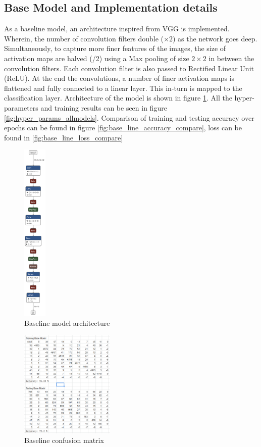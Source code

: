 \documentclass[conference]{IEEEtran}
\begin{document}
		\subsection{Base Model and Implementation details}
		As a baseline model, an architecture inspired from VGG is implemented. Wherein, the number of convolution filters double ($ \times 2$) as the network goes deep. Simultaneously, to capture more finer features of the images, the size of activation maps are halved (/2) using a Max pooling of size $2 \times 2$ in between the convolution filters. Each convolution filter is also passed to Rectified Linear Unit (ReLU). At the end the convolutions, a number of finer activation maps is flattened and fully connected to a linear layer. This in-turn is mapped to the classification layer. Architecture of the model is shown in figure \ref{fig:base_line_model}.
		All the hyper-parameters and training results can be seen in figure \ref{fig:hyper_params_allmodels}. Comparison of training and testing accuracy over epochs can be found in figure \ref{fig:base_line_accuracy_compare}, loss can be found in \ref{fig:base_line_loss_compare}
	
		\begin{figure}
			\centering
			\includegraphics[width=0.1\textwidth,scale=0.3]{models/base_line.png}
			\caption{Baseline model architecture}
			\label{fig:base_line_model}
		\end{figure}

		\begin{figure}
			\centering
			\includegraphics[width=0.4\textwidth]{CM/base_model.png}
			\caption{Baseline confusion matrix}
			\label{fig:base_line_model_cm}
		\end{figure}
%	
%		
\end{document}

